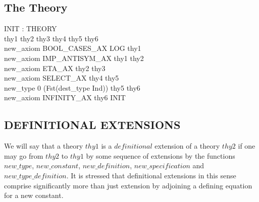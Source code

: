 \documentclass[a4paper,11pt,titlepage]{article}
\begin{document}
\begin{titlepage}
\subsection{The Theory}
\begin{HOLConst}
\+	\PrNL{}INIT\PrNN{} : THEORY\\
\PrPH{}
\+	\MMM{\exists} thy1 thy2 thy3 thy4 thy5 thy6 \MMM{\bullet}\\
\+	new\_axiom BOOL\_CASES\_AX LOG thy1\\
\+\MMM{\land}	new\_axiom IMP\_ANTISYM\_AX thy1 thy2\\
\+\MMM{\land}	new\_axiom ETA\_AX thy2 thy3\\
\+\MMM{\land}	new\_axiom SELECT\_AX thy4 thy5\\
\+\MMM{\land}	new\_type 0 (Fst(dest\_type Ind)) thy5 thy6\\
\+\MMM{\land}	new\_axiom INFINITY\_AX thy6 INIT\\
\end{HOLConst}



\subsection{DEFINITIONAL EXTENSIONS}\label{DEFINITIONALEXTENSIONS}

We will say that a theory $thy1$ is a $definitional$ extension
of a theory $thy2$ if one may go from $thy2$ to $thy1$ by
some sequence of
extensions by the functions
$new\_type$, $new\_constant$, $new\_definition$,
$new\_specification$ and $new\_type\_definition$.
It is stressed that definitional extensions in this sense
comprise significantly more than just extension by adjoining a defining
equation for a new constant.


\end{titlepage}
\end{document}
